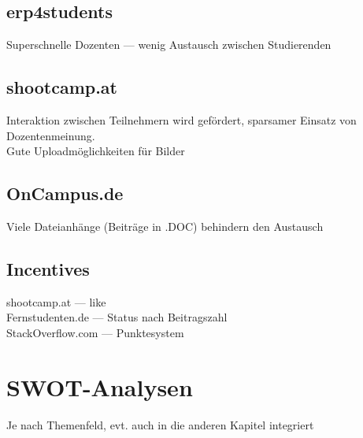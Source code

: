 \subsection{erp4students} %
\label{sub:erp4students}
Superschnelle Dozenten --- wenig Austausch zwischen Studierenden

\subsection{shootcamp.at} %
\label{sub:shootcamp_at}
Interaktion zwischen Teilnehmern wird gefördert, sparsamer Einsatz von Dozentenmeinung.\\
Gute Uploadmöglichkeiten für Bilder

\subsection{OnCampus.de} %
\label{sub:oncampus_de}
Viele Dateianhänge (Beiträge in .DOC) behindern den Austausch

\subsection{Incentives} %
\label{sub:infentives}
shootcamp.at --- like\\
Fernstudenten.de --- Status nach Beitragszahl\\
StackOverflow.com --- Punktesystem


\section{SWOT-Analysen} %
\label{sec:swot_analysen}
Je nach  Themenfeld, evt. auch in die anderen Kapitel integriert
